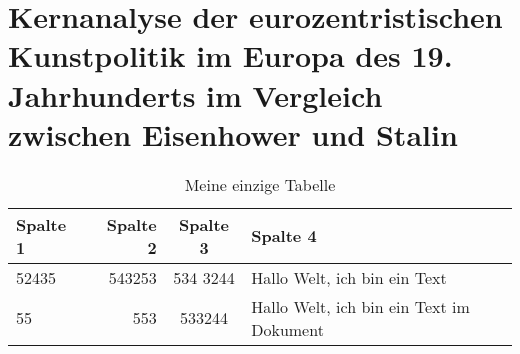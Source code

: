 \chapter[Kernanalyse der eurozentristischen Kunstpolitik]{Kernanalyse der eurozentristischen Kunstpolitik im Europa des 19. Jahrhunderts im Vergleich zwischen Eisenhower und Stalin}

\blindtext[3]


\begin{table}[b]
\begin{center}
\caption{Meine einzige Tabelle}\label{tab:tabelle}
\begin{tabular}{lrcp{6cm}} \toprule 
Spalte 1 & Spalte 2 & Spalte 3 & Spalte 4 \\ \midrule
52435 & 543253 & 534 3244 & Hallo Welt, ich bin ein Text \\
55 & 553 & 533244 & Hallo Welt, ich bin ein Text im Dokument\\ \bottomrule
\end{tabular}
\end{center}
\end{table}

\blindtext[3]

